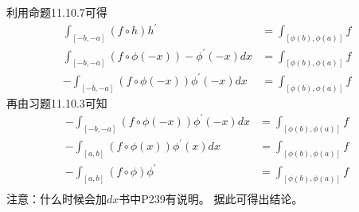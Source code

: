 \documentclass{article}
\begin{document}
利用命题11.10.7可得
\begin{align*}
  \int_{[-b, -a]} (f \circ h) h^\prime                   & = \int_{[\phi(b), \phi(a)]} f \\
  \int_{[-b, -a]} (f \circ \phi(-x)) -\phi^\prime(-x) dx & = \int_{[\phi(b), \phi(a)]} f \\
  -\int_{[-b, -a]} (f \circ \phi(-x)) \phi^\prime(-x) dx & = \int_{[\phi(b), \phi(a)]} f
\end{align*}
再由习题11.10.3可知
\begin{align*}
  -\int_{[-b, -a]} (f \circ \phi(-x)) \phi^\prime(-x) dx & = \int_{[\phi(b), \phi(a)]} f \\
  -\int_{[a, b]} (f \circ \phi(x)) \phi^\prime(x) dx     & = \int_{[\phi(b), \phi(a)]} f \\
  -\int_{[a, b]} (f \circ \phi) \phi^\prime              & = \int_{[\phi(b), \phi(a)]} f \\
\end{align*}
注意：什么时候会加$dx$书中P239有说明。
据此可得出结论。
\end{document}

